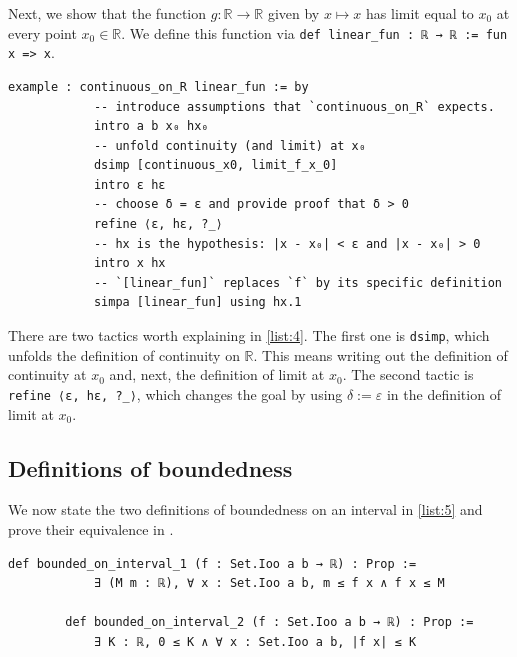 \documentclass[a4paper,11pt]{article}
\theoremstyle{plain}
\newcommand{\R}{\ensuremath{\mathbb{R}}} %
\begin{document}
	Next, we show that the function $g:\R\rightarrow\R$ given by $x\mapsto x$ has limit equal to $x_0$ at every point $x_0\in\R$. We define this function via \lstinline|def linear_fun : ℝ → ℝ := fun x => x|.\\
	
	\begin{lstlisting}[caption={Example that $\lim_{x\rightarrow x_0}x=x_0$.}, label={list:4}]
		example : continuous_on_R linear_fun := by
			-- introduce assumptions that `continuous_on_R` expects.
			intro a b x₀ hx₀
			-- unfold continuity (and limit) at x₀
			dsimp [continuous_x0, limit_f_x_0]
			intro ε hε
			-- choose δ = ε and provide proof that δ > 0
			refine ⟨ε, hε, ?_⟩
			-- hx is the hypothesis: |x - x₀| < ε and |x - x₀| > 0
			intro x hx
			-- `[linear_fun]` replaces `f` by its specific definition
			simpa [linear_fun] using hx.1
	\end{lstlisting}
	
	There are two tactics worth explaining in \cref{list:4}. The first one is \lstinline|dsimp|, which unfolds the definition of continuity on $\R$. This means writing out the definition of continuity at $x_0$ and, next, the definition of limit at $x_0$. The second tactic is \lstinline|	refine ⟨ε, hε, ?_⟩|, which changes the goal by using $\delta:=\varepsilon$ in the definition of limit at $x_0$. 
	
	\subsection{Definitions of boundedness}
	
	We now state the two definitions of boundedness on an interval in \cref{list:5} and prove their equivalence in .\\
	
	\begin{lstlisting}[caption={Two equivalent definitions of boundedness.}, label={list:5}]
		def bounded_on_interval_1 (f : Set.Ioo a b → ℝ) : Prop :=
			∃ (M m : ℝ), ∀ x : Set.Ioo a b, m ≤ f x ∧ f x ≤ M
		
		def bounded_on_interval_2 (f : Set.Ioo a b → ℝ) : Prop :=
			∃ K : ℝ, 0 ≤ K ∧ ∀ x : Set.Ioo a b, |f x| ≤ K
	\end{lstlisting}
	
\end{document}
